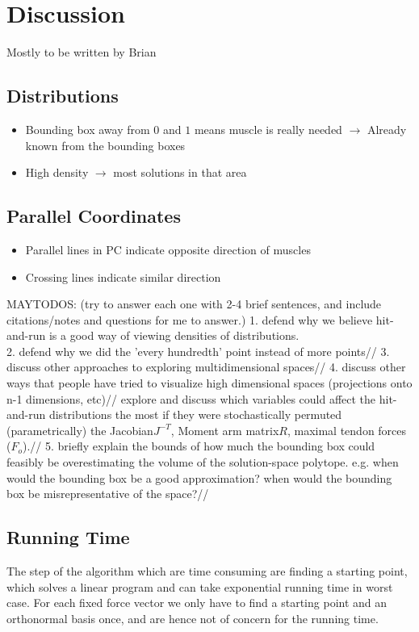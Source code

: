 \section{Discussion}
Mostly to be written by Brian
\subsection{Distributions}

\begin{itemize}
	\item Bounding box away from $0$ and $1$ means muscle is really needed $\rightarrow$ Already known from the bounding boxes
	\item High density $\rightarrow$ most solutions in that area
\end{itemize}

\subsection{Parallel Coordinates}
\begin{itemize}
	\item Parallel lines in PC indicate opposite direction of muscles
	\item Crossing lines indicate similar direction

\end{itemize}


MAYTODOS: (try to answer each one with 2-4 brief sentences, and include citations/notes and questions for me to answer.)
	1. defend why we believe hit-and-run is a good way of viewing densities of distributions.\\
	2. defend why we did the 'every hundredth' point instead of more points//
	3. discuss other approaches to exploring multidimensional spaces//
	4. discuss other ways that people have tried to visualize high dimensional spaces (projections onto n-1 dimensions, etc)//
	explore and discuss which variables could affect the hit-and-run distributions the most if they were stochastically permuted (parametrically) the Jacobian$J^{-T}$, Moment arm matrix$R$, maximal tendon forces ($F_o$).//
	5. briefly explain the bounds of how much the bounding box could feasibly be overestimating the volume of the solution-space polytope. e.g. when would the bounding box be a good approximation? when would the bounding box be misrepresentative of the space?//

\subsection{Running Time}
The step of the algorithm which are time consuming are finding a starting point, which solves a linear program and can take exponential running time in worst case. For each fixed force vector we only have to find a starting point and an orthonormal basis once, and are hence not of concern for the running time.


